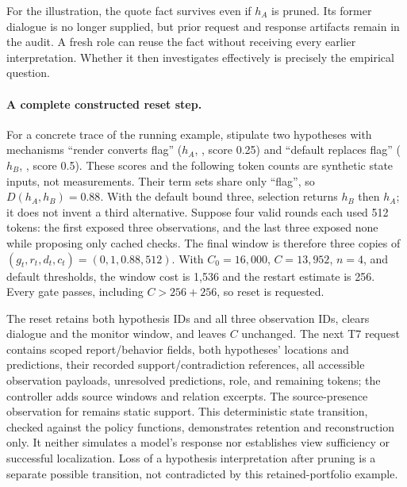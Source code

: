 \documentclass[letterpaper,journal]{IEEEtran}
\newcommand{\code}[1]{\texttt{\detokenize{#1}}}
\begin{document}
For the illustration, the quote fact survives even if $h_A$ is pruned. Its former dialogue is no longer supplied, but prior request and response artifacts remain in the audit. A fresh role can reuse the fact without receiving every earlier interpretation. Whether it then investigates \code{config.py} effectively is precisely the empirical question.

\paragraph{A complete constructed reset step.}
For a concrete trace of the running example, stipulate two hypotheses with mechanisms ``render converts flag'' ($h_A$, \code{handler.py}, score 0.25) and ``default replaces flag'' ($h_B$, \code{config.py}, score 0.5). These scores and the following token counts are synthetic state inputs, not measurements. Their term sets share only ``flag'', so $D(h_A,h_B)=0.88$. With the default bound three, selection returns $h_B$ then $h_A$; it does not invent a third alternative. Suppose four valid rounds each used 512 tokens: the first exposed three observations, and the last three exposed none while proposing only cached checks. The final window is therefore three copies of $(g_t,r_t,d_t,c_t)=(0,1,0.88,512)$. With $C_0=16{,}000$, $C=13{,}952$, $n=4$, and default thresholds, the window cost is 1,536 and the restart estimate is 256. Every gate passes, including $C>256+256$, so reset is requested.

The reset retains both hypothesis IDs and all three observation IDs, clears dialogue and the monitor window, and leaves $C$ unchanged. The next T7 request contains scoped report/behavior fields, both hypotheses' locations and predictions, their recorded support/contradiction references, all accessible observation payloads, unresolved predictions, role, and remaining tokens; the controller adds source windows and relation excerpts. The source-presence observation for \code{or True} remains static support. This deterministic state transition, checked against the policy functions, demonstrates retention and reconstruction only. It neither simulates a model's response nor establishes view sufficiency or successful localization. Loss of a hypothesis interpretation after pruning is a separate possible transition, not contradicted by this retained-portfolio example.
\end{document}
